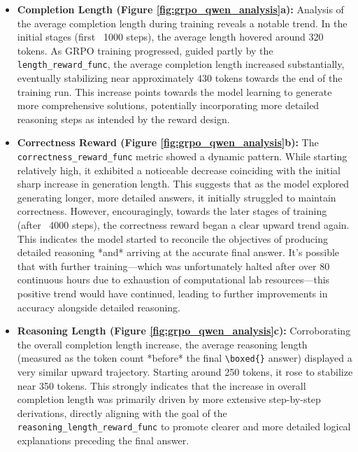 \documentclass[11pt]{article}
\begin{document}
\begin{itemize}
\begin{itemize}
    \item \textbf{Completion Length (Figure \ref{fig:grpo_qwen_analysis}a):} Analysis of the average completion length during training reveals a notable trend. In the initial stages (first ~1000 steps), the average length hovered around 320 tokens. As GRPO training progressed, guided partly by the \texttt{length\_reward\_func}, the average completion length increased substantially, eventually stabilizing near approximately 430 tokens towards the end of the training run. This increase points towards the model learning to generate more comprehensive solutions, potentially incorporating more detailed reasoning steps as intended by the reward design.

    \item \textbf{Correctness Reward (Figure \ref{fig:grpo_qwen_analysis}b):} The \texttt{correctness\_reward\_func} metric showed a dynamic pattern. While starting relatively high, it exhibited a noticeable decrease coinciding with the initial sharp increase in generation length. This suggests that as the model explored generating longer, more detailed answers, it initially struggled to maintain correctness. However, encouragingly, towards the later stages of training (after ~4000 steps), the correctness reward began a clear upward trend again. This indicates the model started to reconcile the objectives of producing detailed reasoning *and* arriving at the accurate final answer. It's possible that with further training—which was unfortunately halted after over 80 continuous hours due to exhaustion of computational lab resources—this positive trend would have continued, leading to further improvements in accuracy alongside detailed reasoning.

    \item \textbf{Reasoning Length (Figure \ref{fig:grpo_qwen_analysis}c):} Corroborating the overall completion length increase, the average reasoning length (measured as the token count *before* the final \verb|\boxed{}| answer) displayed a very similar upward trajectory. Starting around 250 tokens, it rose to stabilize near 350 tokens. This strongly indicates that the increase in overall completion length was primarily driven by more extensive step-by-step derivations, directly aligning with the goal of the \texttt{reasoning\_length\_reward\_func} to promote clearer and more detailed logical explanations preceding the final answer.


\end{itemize}
\end{itemize}
\end{document}
